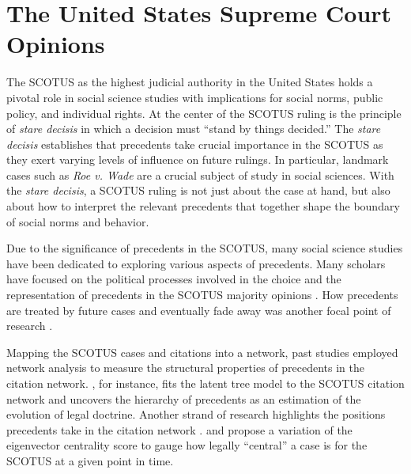 \section{The United States Supreme Court Opinions}
\label{sec:applicationBK}

The SCOTUS as the highest judicial authority in the United States holds a pivotal role in social science studies with implications for social norms, public policy, and individual rights. 
At the center of the SCOTUS ruling is the principle of \textit{stare decisis} in which a decision must ``stand by things decided.''
The \textit{stare decisis} establishes that precedents take crucial importance in the SCOTUS as they exert varying levels of influence on future rulings.
In particular, landmark cases such as \textit{Roe v. Wade} are a crucial subject of study in social sciences. 
With the \textit{stare decisis}, a SCOTUS ruling is not just about the case at hand, but also about how to interpret the relevant precedents that together shape the boundary of social norms and behavior. 

Due to the significance of precedents in the SCOTUS, many social science studies have been dedicated to exploring various aspects of precedents.
Many scholars have focused on the political processes involved in the choice and the representation of precedents in the SCOTUS majority opinions \citep{hansford2006politics, bailey2008does,clark2010locating}.
How precedents are treated by future cases and eventually fade away was another focal point of research \citep{black2013citation, broughman2017after}.

Mapping the SCOTUS cases and citations into a network, past studies employed network analysis to measure the structural properties of precedents in the citation network.
\cite{clark2012genealogy}, for instance, fits the latent tree model to the SCOTUS citation network and uncovers the hierarchy of precedents as an estimation of the evolution of legal doctrine.
Another strand of research highlights the positions precedents take in the citation network \citep{fowler2005authority, fowler2007network}.
\cite{fowler2007network} and \cite{fowler2008authority} propose a variation of the eigenvector centrality score to gauge how legally ``central'' a case is for the SCOTUS at a given point in time.


